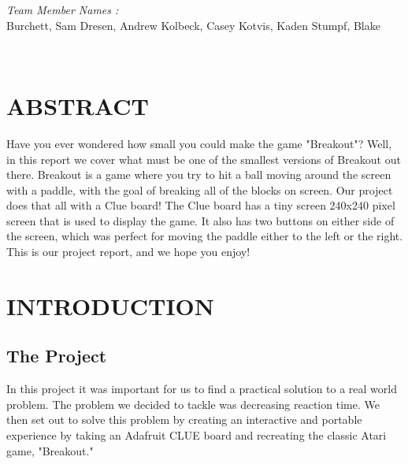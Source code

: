 \documentclass[12pt]{article}
\begin{document}
\begin{titlepage}
\begin{minipage}{0.8\textwidth}
			\begin{flushleft} 
			\emph{Team Member Names :} \\
			Burchett, Sam\linebreak
			Dresen, Andrew\linebreak
			Kolbeck, Casey\linebreak
			Kotvis, Kaden\linebreak
			Stumpf, Blake\linebreak
			
		\end{flushleft}
	\end{minipage}\\[2 cm]
	
	\vfill
	
\end{titlepage}

\tableofcontents
\pagebreak

\section{ABSTRACT}
Have you ever wondered how small you could make the game "Breakout"? Well, in this report we cover what must be one of the smallest versions of Breakout out there. Breakout is a game where you try to hit a ball moving around the screen with a paddle, with the goal of breaking all of the blocks on screen. Our project does that all with a Clue board! The Clue board has a tiny screen 240x240 pixel screen that is used to display the game. It also has two buttons on either side of the screen, which was perfect for moving the paddle either to the left or the right. This is our project report, and we hope you enjoy!

\section{INTRODUCTION}

\subsection{The Project}
In this project it was important for us to find a practical solution to a real world problem. The problem we decided to tackle was decreasing reaction time. We then set out to solve this problem by creating an interactive and portable experience by taking an Adafruit CLUE board and recreating the classic Atari game, "Breakout." 
\end{document}
